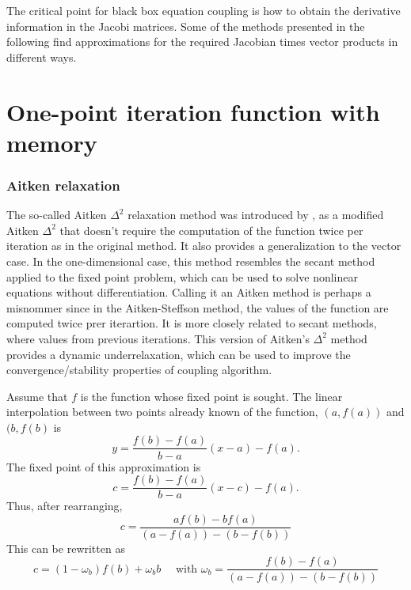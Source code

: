 The critical point for black box equation coupling is how to obtain the derivative information in the Jacobi matrices.
Some of the methods presented in the following find approximations for the required Jacobian times vector products in different ways.


\section{One-point iteration function with memory}


\subsubsection{Aitken relaxation}

\citep{irons_version_1969, kuttler_fixed-point_2008, joosten_analysis_2009, kuttler_vector_2009, erbts_partitioned_2015, wendt_partitioned_2015}


The so-called Aitken \(\Delta^2\) relaxation method was introduced by \cite{irons_version_1969}, as a modified Aitken \(\Delta^2\) that doesn't require the computation of the function twice per iteration as in the original method.
It also provides a generalization to the vector case.
In the one-dimensional case, this method resembles the secant method applied to the fixed point problem, which can be used to solve nonlinear equations without differentiation.
Calling it an Aitken method is perhaps a misnommer since in the Aitken-Steffson method, the values of the function are computed twice prer iterartion.
It is more closely related to secant methods, where values from previous iterations.
This version of Aitken's \(\Delta^2\) method provides a dynamic underrelaxation, which can be used to improve the convergence/stability properties of coupling algorithm.

Assume that \(f\) is the function whose fixed point is sought.
The linear interpolation between two points already known of the function, \((a, f(a))\) and \((b, f(b)\) is
\begin{equation}
  y = \frac{f(b)-f(a)}{b-a}(x-a) - f(a).
\end{equation}
The fixed point of this approximation is
\begin{equation}
  c = \frac{f(b)-f(a)}{b-a}(x-c) - f(a).
\end{equation}
Thus, after rearranging,
\begin{equation}
c=\frac{a f(b)- b f(a)}{\left(a-f(a)\right)-\left(b-f(b)\right)}
\end{equation}
This can be rewritten as
\begin{equation}
c=\left(1-\omega_{b}\right) f(b)+\omega_{b} b \quad \text { with } \omega_{b}=\frac{f(b)-f(a)}{\left(a-f(a)\right)-\left(b-f(b)\right)}
\end{equation}

